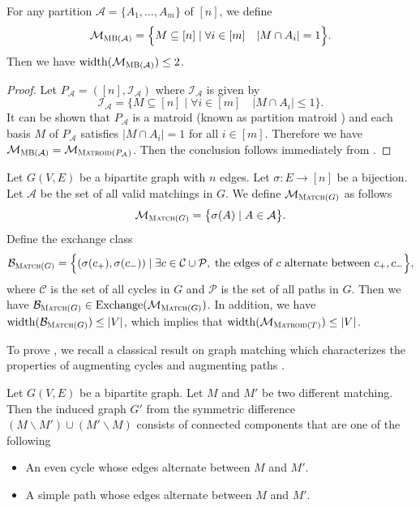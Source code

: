 \documentclass{article}
\newcommand{\M}{\mathcal M}
\newcommand{\B}{\mathcal B}
\newcommand{\del}{\backslash}
\DeclareMathOperator{\rank}{width}
\DeclareMathOperator{\Exchange}{Exchange}
\newcommand{\MultiBandit}{\textsc{MB}\xspace}
\newcommand{\Matroid}{\textsc{Matroid}\xspace}
\newcommand{\Match}{\textsc{Match}\xspace}
\begin{document}
\begin{fact}[\MultiBandit]
\label{fact:multibandit}
For any partition $\mathcal A =\{A_1,\ldots,A_m\}$ of $[n]$, we define
$$\M_{\MultiBandit(\mathcal A)} = \Big\{M\subseteq [n] \mid \forall i\in[m] \quad |M\cap A_i| = 1\Big\}.$$
Then we have $\rank(\M_{\MultiBandit(\mathcal A)}) \le 2$.
\end{fact}

\begin{proof}
Let $P_{\mathcal A}=([n], \mathcal I_{\mathcal A})$ where $\mathcal I_{\mathcal A}$ is given by
$$
\mathcal I_{\mathcal A} = \big\{M \subseteq [n] \mid \forall i\in[m] \quad |M\cap A_i| \le 1 \big\}.
$$
It can be shown that $P_{\mathcal A}$ is a matroid (known as partition matroid \citep{oxley2006matroid}) and each basis $M$ of $P_{\mathcal A}$
satisfies $|M\cap A_i| = 1$ for all $i\in [m]$.
Therefore we have $\M_{\MultiBandit(\mathcal A)}=\M_{\Matroid(P_{\mathcal A})}$. 
Then the conclusion follows immediately from .
\end{proof}



\begin{fact}[Matching]
\label{fact:match}
Let $G(V,E)$ be a bipartite graph with $n$ edges.
Let $\sigma\colon E\rightarrow [n]$ be a bijection.
Let $\mathcal A$ be the set of all valid matchings in $G$. 
We define $\M_{\Match(G)}$ as follows
$$
\M_{\Match(G)} = \big\{\sigma(A) \mid A\in\mathcal A \big\}.
$$
Define the exchange class
$$
\B_{\Match(G)} = \Big\{(\sigma(c_+),\sigma(c_-)) \mid \exists c\in \mathcal C\cup \mathcal P,\; \text{the edges of }c\text{ alternate between } c_+,c_-\Big\},
$$
where $\mathcal C$ is the set of all cycles in $G$ and $\mathcal P$ is the set of all paths in $G$.
Then we have $\B_{\Match(G)} \in \Exchange(\M_{\Match(G)})$. 
In addition, we have $\rank(\B_{\Match(G)}) \le |V|$, which implies that $\rank(\M_{\Matroid(T)}) \le |V|$. 
\end{fact}


To prove , we recall a classical result on graph matching which characterizes the properties of augmenting cycles and augmenting paths \citep{Berge15091957}.
\begin{lemma}
\label{lemma:match}
Let $G(V,E)$ be a bipartite graph.
Let $M$ and $M'$ be two different matching.
Then the induced graph $G'$ from the symmetric difference $(M\del M')\cup (M'\del M)$ consists of connected components that are one of the following
\begin{itemize}
\item An even cycle whose edges alternate between $M$ and $M'$.
\item A simple path whose edges alternate between $M$ and $M'$.
\end{itemize}
\end{lemma}
\end{document}
